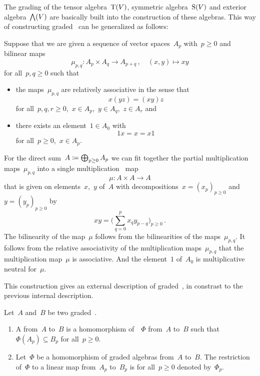 \begin{remark}
  \label{external description of graded algebras}
  The grading of the tensor algebra~$\operatorname{T}(V)$, symmetric algebra~$\operatorname{S}(V)$ and exterior algebra~$\operatorname{\bigwedge}(V)$ are basically built into the construction of these algebras.
  This way of constructing graded~{\algebras{$\kf$}} can be generalized as follows:
  
  Suppose that we are given a sequence of vector spaces~$A_p$ with~$p \geq 0$ and bilinear maps
  \[
    \mu_{p,q}
    \colon
    A_p \times A_q
    \to
    A_{p+q} \,,
    \quad
    (x,y)
    \mapsto
    xy
  \]
  for all~$p, q \geq 0$ such that
  \begin{itemize}
    \item
      the maps~$\mu_{p, q}$ are relatively associative in the sense that
      \[
        x(yz)
        =
        (xy)z
      \]
      for all~$p, q, r \geq 0$,~$x \in A_p$,~$y \in A_q$,~$z \in A_r$ and
    \item
      there exists an element~$1 \in A_0$ with
      \[
        1 x
        =
        x
        =
        x 1
      \]
      for all~$p \geq 0$,~$x \in A_p$.
  \end{itemize}
  For the direct sum~$A \coloneqq \bigoplus_{p \geq 0} A_p$ we can fit together the partial multiplication maps~$\mu_{p,q}$ into a single multiplication~ map
  \[
    \mu
    \colon
    A \times A
    \to
    A
  \]
  that is given on elements~$x$,~$y$ of~$A$ with decompositions~$x = (x_p)_{p \geq 0}$ and~$y = (y_p)_{p \geq 0}$ by
  \[
    x y
    =
    \Biggl( \sum_{q=0}^p x_q y_{p-q} \Biggr)_{p \geq 0}  \,.
  \]
  The bilinearity of the map~$\mu$ follows from the bilinearities of the maps~$\mu_{p,q}$.
  It follows from the relative associativity of the multiplication maps~$\mu_{p,q}$ that the multiplication map~$\mu$ is associative.
  And the element~$1$ of~$A_0$ is multiplicative neutral for~$\mu$.
  
  This construction gives an external description of graded~{\algebras{$\kf$}}, in constrast to the previous internal description.
\end{remark}


\begin{definition}
  Let~$A$ and~$B$ be two graded~\algebras{$\kf$}.
  \begin{enumerate}
    \item
      A  from~$A$ to~$B$ is a homomorphism of~{\algebras{$\kf$}}~$\Phi$ from~$A$ to~$B$ such that~$\Phi(A_p) \subseteq B_p$ for all~$p \geq 0$.
    \item
      Let~$\Phi$ be a homomorphism of graded algebras from~$A$ to~$B$.
      The restriction of~$\Phi$ to a linear map from~$A_p$ to~$B_p$ is for all~$p \geq 0$ denoted by~$\Phi_p$.
  \end{enumerate}
\end{definition}


